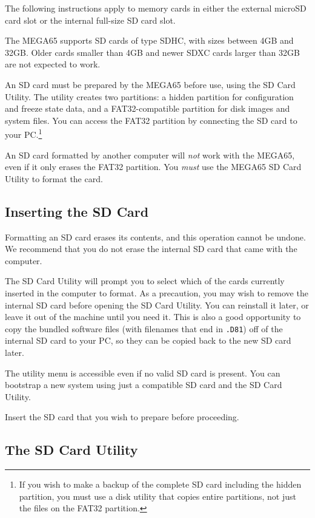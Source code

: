 The following instructions apply to memory cards in either the external microSD card slot or the internal full-size SD card slot.

The MEGA65 supports SD cards of type SDHC, with sizes between 4GB and 32GB. Older cards smaller than 4GB and newer SDXC cards larger than 32GB are not expected to work.

An SD card must be prepared by the MEGA65 before use, using the SD Card Utility. The utility creates two partitions: a hidden partition for configuration and freeze state data, and a FAT32-compatible partition for disk images and system files. You can access the FAT32 partition by connecting the SD card to your PC.\footnote{If you wish to make a backup of the complete SD card including the hidden partition, you must use a disk utility that copies entire partitions, not just the files on the FAT32 partition.}

An SD card formatted by another computer will {\em not} work with the MEGA65, even if it only erases the FAT32 partition. You {\em must} use the MEGA65 SD Card Utility to format the card.

\subsection{Inserting the SD Card}

Formatting an SD card erases its contents, and this operation cannot be undone. We recommend that you do not erase the internal SD card that came with the computer.

The SD Card Utility will prompt you to select which of the cards currently inserted in the computer to format. As a precaution, you may wish to remove the internal SD card before opening the SD Card Utility. You can reinstall it later, or leave it out of the machine until you need it. This is also a good opportunity to copy the bundled software files (with filenames that end in {\tt .D81}) off of the internal SD card to your PC, so they can be copied back to the new SD card later.

The utility menu is accessible even if no valid SD card is present. You can bootstrap a new system using just a compatible SD card and the SD Card Utility.

Insert the SD card that you wish to prepare before proceeding.

\subsection{The SD Card Utility}


